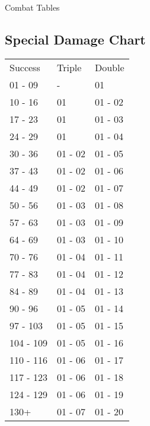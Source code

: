 \begin{Tables}{Combat Tables}
\begin{multicols}{3}
\section{Special Damage Chart}

\begin{tabularx}{\columnwidth}{XXX}
Success		& Triple	& Double \\
01 - 09		& -		& 01 \\
10 - 16		& 01		& 01 - 02 \\
17 - 23		& 01		& 01 - 03 \\
24 - 29		& 01		& 01 - 04 \\
30 - 36		& 01 - 02	& 01 - 05 \\
37 - 43		& 01 - 02	& 01 - 06 \\
44 - 49		& 01 - 02	& 01 - 07 \\
50 - 56		& 01 - 03	& 01 - 08 \\
57 - 63		& 01 - 03	& 01 - 09 \\
64 - 69		& 01 - 03	& 01 - 10 \\
70 - 76		& 01 - 04	& 01 - 11 \\
77 - 83		& 01 - 04	& 01 - 12 \\
84 - 89		& 01 - 04	& 01 - 13 \\
90 - 96		& 01 - 05	& 01 - 14 \\
97 - 103	& 01 - 05	& 01 - 15 \\
104 - 109	& 01 - 05	& 01 - 16 \\
110 - 116	& 01 - 06	& 01 - 17 \\
117 - 123	& 01 - 06	& 01 - 18 \\
124 - 129	& 01 - 06	& 01 - 19 \\
130+		& 01 - 07	& 01 - 20 \\
\end{tabularx}

\end{multicols}
\end{Tables}

